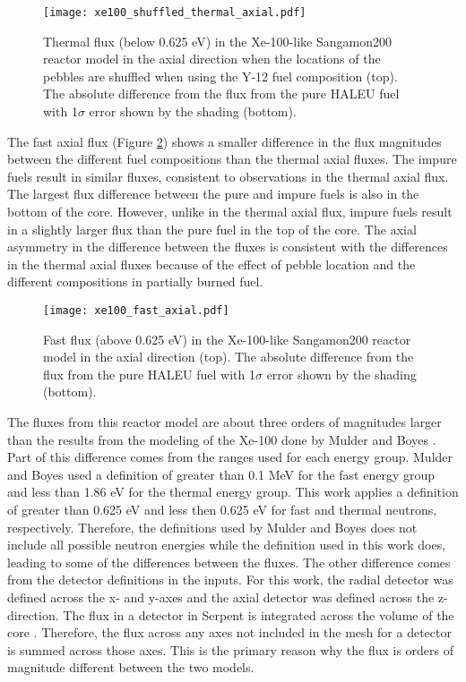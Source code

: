 \begin{figure}[ht]
        \centering 
        \texttt{[image: xe100\_shuffled\_thermal\_axial.pdf]}
        \caption{Thermal flux (below 0.625 eV) in the Xe-100-like Sangamon200 
        reactor model in the axial direction when the locations of 
        the pebbles are shuffled when using the Y-12 fuel composition
        (top). The absolute difference from the flux from 
        the pure \gls{HALEU} fuel with 1$\sigma$ error shown by 
        the shading (bottom).}
        \label{fig:xe100_pebble_shuffle}
\end{figure}

The fast axial flux (Figure \ref{fig:xe100_fast_axial}) shows a smaller 
difference in the flux magnitudes between the different fuel compositions 
than the thermal axial fluxes. The 
impure fuels result in similar fluxes, consistent to observations in 
the thermal axial flux. The largest flux difference between the pure 
and impure fuels is also in the bottom of the core. However, unlike 
in the thermal axial flux, impure fuels result in a slightly larger 
flux than the pure fuel in the top of the core. The axial asymmetry in 
the difference between the fluxes is consistent with the differences in 
the thermal axial fluxes because of the effect of pebble location 
and the different compositions in partially burned fuel. 

\begin{figure}[ht]
        \centering 
        \texttt{[image: xe100\_fast\_axial.pdf]}
        \caption{Fast flux (above 0.625 eV) in the Xe-100-like Sangamon200 
        reactor model in the axial direction (top). The absolute 
        difference from the flux from 
        the pure \gls{HALEU} fuel with 1$\sigma$ error shown by 
        the shading (bottom).}
        \label{fig:xe100_fast_axial}
\end{figure}

The fluxes from this reactor model are about three orders of 
magnitudes larger than the results from the modeling of the 
Xe-100 done by Mulder and 
Boyes \cite{mulder_neutronics_2020}. Part of this difference comes 
from the ranges used for each energy group. Mulder and Boyes used 
a definition of greater than 0.1 MeV for the fast energy group and 
less than 1.86 eV for the thermal energy group. This work applies a 
definition of greater than 0.625 eV and less then 0.625 eV for fast 
and thermal neutrons, respectively. Therefore, the definitions used by 
Mulder and Boyes does not include all possible neutron energies 
while the definition used in this work does, leading to some of the 
differences between the fluxes. 
The other difference  comes from the detector 
definitions in the inputs. For this work, the radial detector 
was defined across the x- and y-axes and the axial detector was defined 
across the z-direction. The flux in a detector in Serpent is integrated 
across the volume of the core \cite{leppanen_serpent_2013}. Therefore, 
the flux across any axes not included in the mesh for a detector is 
summed across those axes. This is the primary reason why the flux is 
orders of magnitude different between the two models. 

